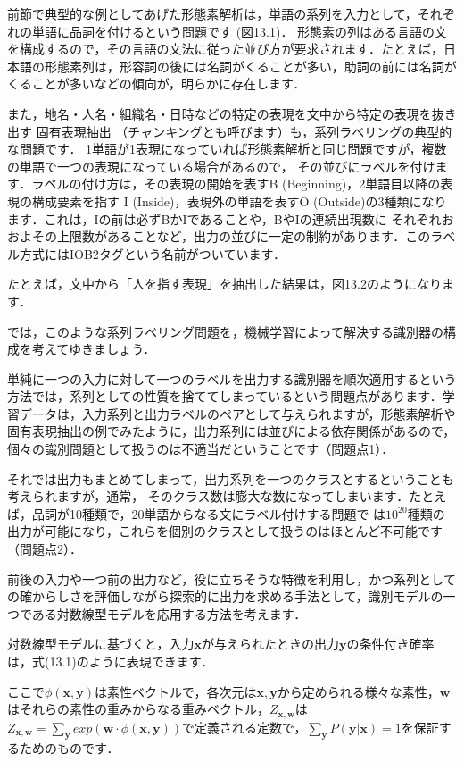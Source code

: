 
前節で典型的な例としてあげた形態素解析は，単語の系列を入力として，それぞれの単語に品詞を付けるという問題です
(図13.1)．
形態素の列はある言語の文を構成するので，その言語の文法に従った並び方が要求されます．たとえば，日本語の形態素列は，形容詞の後には名詞がくることが多い，助詞の前には名詞がくることが多いなどの傾向が，明らかに存在します．

また，地名・人名・組織名・日時などの特定の表現を文中から特定の表現を抜き出す
固有表現抽出
（チャンキングとも呼びます）も，系列ラベリングの典型的な問題です．
1単語が1表現になっていれば形態素解析と同じ問題ですが，複数の単語で一つの表現になっている場合があるので，
その並びにラベルを付けます．ラベルの付け方は，その表現の開始を表すB (Beginning)，2単語目以降の表現の構成要素を指す
I (Inside)，表現外の単語を表すO (Outside)の3種類になります．これは，Iの前は必ずBかIであることや，BやIの連続出現数に
それぞれおおよその上限数があることなど，出力の並びに一定の制約があります．このラベル方式にはIOB2タグという名前がついています．

たとえば，文中から「人を指す表現」を抽出した結果は，図13.2のようになります．  


では，このような系列ラベリング問題を，機械学習によって解決する識別器の構成を考えてゆきましょう．

単純に一つの入力に対して一つのラベルを出力する識別器を順次適用するという方法では，系列としての性質を捨ててしまっているという問題点があります．学習データは，入力系列と出力ラベルのペアとして与えられますが，形態素解析や固有表現抽出の例でみたように，出力系列には並びによる依存関係があるので，個々の識別問題として扱うのは不適当だということです（問題点1）．

それでは出力もまとめてしまって，出力系列を一つのクラスとするということも考えられますが，通常，
そのクラス数は膨大な数になってしまいます．たとえば，品詞が10種類で，20単語からなる文にラベル付けする問題で
は$10^{20}$種類の出力が可能になり，これらを個別のクラスとして扱うのはほとんど不可能です（問題点2）．


前後の入力や一つ前の出力など，役に立ちそうな特徴を利用し，かつ系列としての確からしさを評価しながら探索的に出力を求める手法として，識別モデルの一つである対数線型モデルを応用する方法を考えます．

対数線型モデルに基づくと，入力$\bm{x}$が与えられたときの出力$\bm{y}$の条件付き確率は，式(13.1)のように表現できます．

ここで$\phi(\bm{x}, \bm{y})$は素性ベクトルで，各次元は$\bm{x}, \bm{y}$から定められる様々な素性，$\bm{w}$はそれらの素性の重みからなる重みベクトル，$Z_{\bm{x},\bm{w}}$は$Z_{\bm{x},\bm{w}}=\sum_{\bm{y}} exp(\bm{w}\cdot\phi(\bm{x}, \bm{y}))$で定義される定数で，$\sum_{\bm{y}}P(\bm{y}|\bm{x})=1$を保証するためのものです．

